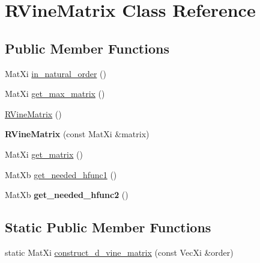 \hypertarget{class_r_vine_matrix}{\section{R\+Vine\+Matrix Class Reference}
\label{class_r_vine_matrix}
}
\subsection*{Public Member Functions}
\begin{DoxyCompactItemize}
\item 
Mat\+Xi \hyperlink{class_r_vine_matrix_aa4c4b6db1e03ca248e6ee2977d94c122}{in\+\_\+natural\+\_\+order} ()
\item 
Mat\+Xi \hyperlink{class_r_vine_matrix_a41f2c2fcfbf6cddb85783d164c26f7cf}{get\+\_\+max\+\_\+matrix} ()
\end{DoxyCompactItemize}
{\bf }\par
\begin{DoxyCompactItemize}
\item 
\hyperlink{class_r_vine_matrix_ab58141cea327509270023fc7ea28fc4a}{R\+Vine\+Matrix} ()
\item 
\hypertarget{class_r_vine_matrix_a815d158891d25984bf199b459d77bb3c}{{\bfseries R\+Vine\+Matrix} (const Mat\+Xi \&matrix)}\label{class_r_vine_matrix_a815d158891d25984bf199b459d77bb3c}

\end{DoxyCompactItemize}

{\bf }\par
\begin{DoxyCompactItemize}
\item 
Mat\+Xi \hyperlink{class_r_vine_matrix_a7ce70c0f0f93f3e42dde78797cce7ebc}{get\+\_\+matrix} ()
\end{DoxyCompactItemize}

{\bf }\par
\begin{DoxyCompactItemize}
\item 
Mat\+Xb \hyperlink{class_r_vine_matrix_a4492de2a5c849a09a48f2aacfa2da553}{get\+\_\+needed\+\_\+hfunc1} ()
\item 
\hypertarget{class_r_vine_matrix_af986964fb480b66f7ccebde78dc98dfd}{Mat\+Xb {\bfseries get\+\_\+needed\+\_\+hfunc2} ()}\label{class_r_vine_matrix_af986964fb480b66f7ccebde78dc98dfd}

\end{DoxyCompactItemize}

\subsection*{Static Public Member Functions}
\begin{DoxyCompactItemize}
\item 
static Mat\+Xi \hyperlink{class_r_vine_matrix_ac18325bf187aa488c79adb5a94fff3ab}{construct\+\_\+d\+\_\+vine\+\_\+matrix} (const Vec\+Xi \&order)
\end{DoxyCompactItemize}


